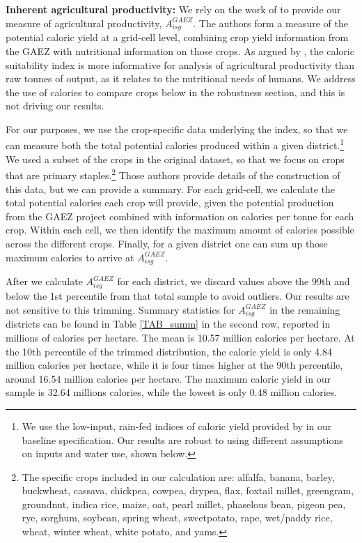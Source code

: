 \documentclass[11pt]{article}
\begin{document}
\vspace{.5cm}\noindent\textbf{Inherent agricultural productivity:} We rely on the work of \citet{galorozak2016} to provide our measure of agricultural productivity, $A^{GAEZ}_{isg}$. The authors form a measure of the potential caloric yield at a grid-cell level, combining crop yield information from the GAEZ with nutritional information on those crops. As argued by \citet{galorozak2016}, the caloric suitability index is more informative for analysis of agricultural productivity than raw tonnes of output, as it relates to the nutritional needs of humans. We address the use of calories to compare crops below in the robustness section, and this is not driving our results.

For our purposes, we use the crop-specific data underlying the \citet{galorozak2016} index, so that we can measure both the total potential calories produced within a given district.\footnote{We use the low-input, rain-fed indices of caloric yield provided by \citet{galorozak2016} in our baseline specification. Our results are robust to using different assumptions on inputs and water use, shown below.} We used a subset of the crops in the original \citet{galorozak2016} dataset, so that we focus on crops that are primary staples.\footnote{The specific crops included in our calculation are: alfalfa, banana, barley, buckwheat, cassava, chickpea, cowpea, drypea, flax, foxtail millet, greengram, groundnut, indica rice, maize, oat, pearl millet, phaselous bean, pigeon pea, rye, sorghum, soybean, spring wheat, sweetpotato, rape, wet/paddy rice, wheat, winter wheat, white potato, and yams.} Those authors provide details of the construction of this data, but we can provide a summary. For each grid-cell, we calculate the total potential calories each crop will provide, given the potential production from the GAEZ project \citep{gaez} combined with information on calories per tonne for each crop. Within each cell, we then identify the maximum amount of calories possible across the different crops. Finally, for a given district one can sum up those maximum calories to arrive at $A^{GAEZ}_{isg}$.

After we calculate $A^{GAEZ}_{isg}$ for each district, we discard values above the 99th and below the 1st percentile from that total sample to avoid outliers. Our results are not sensitive to this trimming. Summary statistics for $A^{GAEZ}_{isg}$ in the remaining districts can be found in Table \ref{TAB_summ} in the second row, reported in millions of calories per hectare. The mean is 10.57 million calories per hectare. At the 10th percentile of the trimmed distribution, the caloric yield is only 4.84 million calories per hectare, while it is four times higher at the 90th percentile, around 16.54 million calories per hectare. The maximum caloric yield in our sample is 32.64 millions calories, while the lowest is only 0.48 million calories. 
\end{document}
